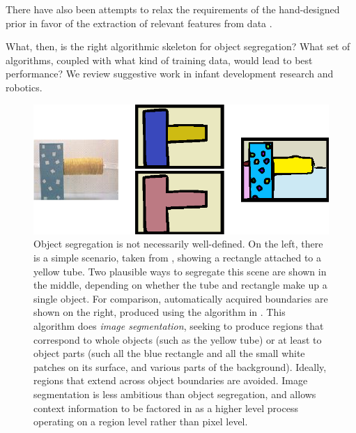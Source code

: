 There have also been attempts to relax the requirements of the hand-designed
prior in favor of the extraction of relevant features from data 
\cite{bell97vision, simoncelli01images}. 

%
What, then, is the right algorithmic skeleton for object
segregation?  What set of algorithms, coupled with what kind of
training data, would lead to best performance?  
%
%
We review suggestive
work in infant development research and robotics.







\begin{figure}

\centerline{
\includegraphics[width=0.75\columnwidth]{fig-seg}}

\caption[Object segregation is not always well-defined]{
%
\ifcapped
%
Object segregation is not necessarily well-defined.
%
%
On the left,
there is a simple scenario, taken from ,
showing a rectangle attached to a yellow tube.  Two 
plausible ways to segregate this scene are shown in the middle,
depending on whether the tube and rectangle make up a single 
object.
%
For
comparison, automatically acquired boundaries are shown on the right,
produced using the algorithm in
. 
This algorithm does {\em image segmentation},
seeking to produce regions that correspond to whole objects (such as the
 yellow
tube) or at least to object parts (such all the blue rectangle and all
the small white patches on its surface, and various parts of the
background).  Ideally, regions that extend across object boundaries
are avoided.  Image segmentation is less ambitious than object segregation,
and allows context information to be factored in as a higher level
process operating on a region level rather than pixel level.
%
%
%
%
%
%
%
\fi
%
}

\label{fig:image-segmentation}

\end{figure}



